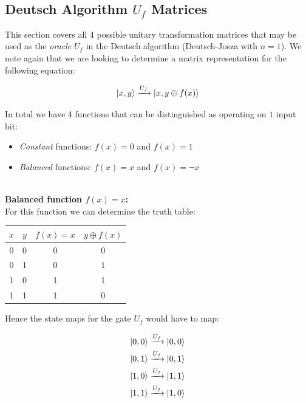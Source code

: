 \documentclass[conference]{IEEEtran}
\begin{document}
\begin{appendices}
 \

\subsection{Deutsch Algorithm $U_{f}$ Matrices}
\label{appendix:deutschAlgorithmMatrices}

This section covers all 4 possible unitary transformation matrices that may be used as the \textit{oracle} $U_{f}$
in the Deutsch algorithm (Deutsch-Josza with $n=1$).
We note again that we are looking to determine a matrix representation for the following equation:

\begin{equation*}
    \ket{x, y} \xrightarrow{U_f} \ket{x, y \oplus f(x)}
\end{equation*}

In total we have 4 functions that can be distinguished as operating on $1$ input bit:
\begin{itemize}
 \item \textit{Constant} functions: $f(x) = 0$ and $f(x) = 1$
 \item \textit{Balanced} functions: $f(x) = x$ and $f(x) = \lnot x$
\end{itemize}
 \ \\

\textbf{Balanced function $f(x) = x$:} \\

For this function we can determine the truth table:

\begin{center}
\begin{tabular}{|c|c|c|c|}
    \hline
    $x$ & $y$ & $f(x) = x$ & $y \oplus f(x)$\\
    \hline
    0 & 0 & 0 & 0 \\
    0 & 1 & 0 & 1 \\
    1 & 0 & 1 & 1 \\
    1 & 1 & 1 & 0 \\
    \hline
\end{tabular}
\end{center}

Hence the state maps for the gate $U_f$ would have to map:

\begin{gather*}
    \ket{0, 0} \xrightarrow{U_f} \ket{0, 0} \\
    \ket{0, 1} \xrightarrow{U_f} \ket{0, 1} \\
    \ket{1, 0} \xrightarrow{U_f} \ket{1, 1} \\
    \ket{1, 1} \xrightarrow{U_f} \ket{1, 0} \\
\end{gather*}


\end{appendices}
\end{document}
